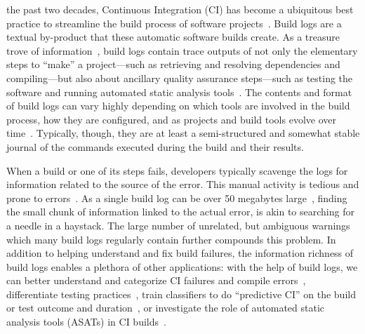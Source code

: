 
%


the past two decades, Continuous Integration (CI) has become a
ubiquitous best practice to streamline the build process of software
projects~\cite{hilton2016usage,beller2017oops,staahl2014modeling}.
Build logs are a textual by-product that these automatic software
builds create.
As a treasure trove of information~\cite{meyer},
build logs contain trace outputs of not only the elementary steps to
``make'' a project---such as retrieving and resolving dependencies and
compiling---but also about ancillary quality assurance steps---such as
testing the software and running automated static analysis tools~\cite{beller2017oops}.
The
contents and format of build logs can vary highly depending on which tools
are involved in the build process, how they are
configured, and as projects and build tools evolve over
time~\cite{staahl2014modeling}.
Typically, though, they are at least a semi-structured and
somewhat stable journal of the commands executed during the build and
their results.

When a build or one of its steps fails, developers typically scavenge
the logs for information related to the source of the error.
This
manual activity is tedious and prone to
errors~\cite{santolucito2018statically}.
As a single build log can be
over 50 megabytes large~\cite{beller2017oops}, finding the small chunk
of information linked to the actual error, is akin to
searching for a needle in a haystack.
The large number of unrelated, but ambiguous
warnings which many build
logs regularly contain further compounds this problem.
In addition to helping
understand and fix build failures, the information richness of build
logs enables a plethora of other applications: with the help of build
logs, we can better understand and categorize CI failures and compile
errors~\cite{islam2017insights,seo2014programmers}, differentiate
testing practices~\cite{orellana2017differences,vassallo2017a-tale},
train classifiers to do ``predictive CI'' on the build or test outcome
and
duration~\cite{ni2017cost,bisong2017built,haghighatkhah2018test,
machalica2019predictive},
or investigate the role of automated static analysis tools (ASATs)
in CI
builds~\cite{zampetti2017open}.

